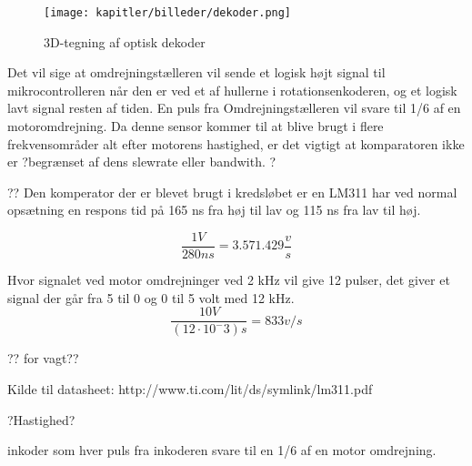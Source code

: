 \begin{figure}[ht]
    \centering
    \texttt{[image: kapitler/billeder/dekoder.png]}
    \caption{3D-tegning af optisk dekoder}
    \label{fig:dekoder}
\end{figure}


Det vil sige at omdrejningstælleren vil sende et logisk højt signal til mikrocontrolleren når den er ved et af hullerne i  rotationsenkoderen, og et logisk lavt signal resten af tiden. En puls fra Omdrejningstælleren vil svare til 1/6 af en motoromdrejning.
Da denne sensor kommer til at blive brugt i flere frekvensområder alt efter motorens hastighed, er det vigtigt at komparatoren ikke er ?begrænset af dens slewrate eller bandwith. ? 


??
Den komperator der er blevet brugt i kredsløbet er en LM311 har ved normal opsætning en respons tid på 165 ns fra høj til lav og 115 ns fra lav til høj.

\begin{equation}
\frac{1 V}{280 ns} = 3.571.429 \frac{v}{s}
\end{equation}

Hvor signalet ved motor omdrejninger ved 2 kHz vil give 12 pulser, det giver et signal der går fra 5 til 0 og 0 til 5 volt med 12 kHz.
\begin{equation}
\frac{10 V}{(12 \cdot 10^-3)s} = 833 v/s
\end{equation}


?? for vagt?? 



Kilde til datasheet: http://www.ti.com/lit/ds/symlink/lm311.pdf


?Hastighed?

inkoder som hver puls fra inkoderen svare til en 1/6 af en motor omdrejning. 